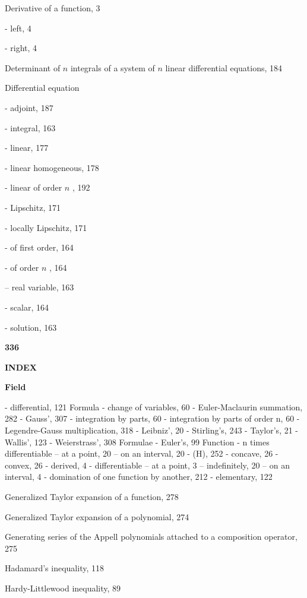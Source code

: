 Derivative of a function, 3

- left, 4

- right, 4

Determinant of \(n\) integrals of a system of \(n\) linear differential equations, 184

Differential equation

- adjoint, 187

- integral, 163

- linear, 177

- linear homogeneous, 178

- linear of order \(n\) , 192

- Lipschitz, 171

- locally Lipschitz, 171

- of first order, 164

- of order \(n\) , 164

-- real variable, 163

- scalar, 164

- solution, 163

\par\noindent\textbf{336}\par

\par\noindent\textbf{INDEX}\par

\par\noindent\textbf{Field}\par

- differential, 121 Formula - change of variables, 60 - Euler-Maclaurin summation, 282 - Gauss', 307 - integration by parts, 60 - integration by parts of order n, 60 - Legendre-Gauss multiplication, 318 - Leibniz', 20 - Stirling's, 243 - Taylor's, 21 - Wallis', 123 - Weierstrass', 308 Formulae - Euler's, 99 Function - n times differentiable -- at a point, 20 -- on an interval, 20 - (H), 252 - concave, 26 - convex, 26 - derived, 4 - differentiable -- at a point, 3 -- indefinitely, 20 -- on an interval, 4 - domination of one function by another, 212 - elementary, 122

Generalized Taylor expansion of a function, 278

Generalized Taylor expansion of a polynomial, 274

Generating series of the Appell polynomials attached to a composition operator, 275

Hadamard's inequality, 118

Hardy-Littlewood inequality, 89

